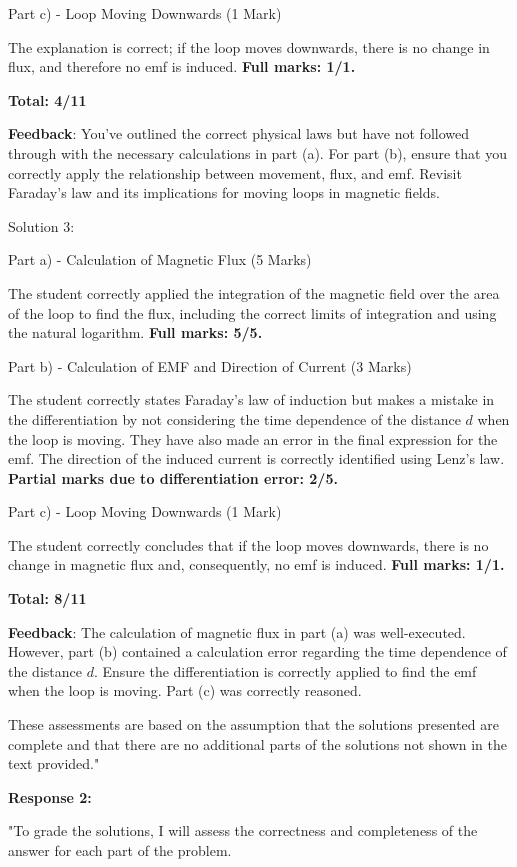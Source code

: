 \documentclass[a4paper,11pt]{article}
\begin{document}
Part c) - Loop Moving Downwards (1 Mark)

The explanation is correct; if the loop moves downwards, there is no change in flux, and therefore no emf is induced. \textbf{Full marks: 1/1.}

\textbf{Total: 4/11}

\textbf{Feedback}: You've outlined the correct physical laws but have not followed through with the necessary calculations in part (a). For part (b), ensure that you correctly apply the relationship between movement, flux, and emf. Revisit Faraday's law and its implications for moving loops in magnetic fields.

Solution 3:

Part a) - Calculation of Magnetic Flux (5 Marks)

The student correctly applied the integration of the magnetic field over the area of the loop to find the flux, including the correct limits of integration and using the natural logarithm. \textbf{Full marks: 5/5.}

Part b) - Calculation of EMF and Direction of Current (3 Marks)

The student correctly states Faraday's law of induction but makes a mistake in the differentiation by not considering the time dependence of the distance \( d \) when the loop is moving. They have also made an error in the final expression for the emf. The direction of the induced current is correctly identified using Lenz's law. \textbf{Partial marks due to differentiation error: 2/5.}

Part c) - Loop Moving Downwards (1 Mark)

The student correctly concludes that if the loop moves downwards, there is no change in magnetic flux and, consequently, no emf is induced. \textbf{Full marks: 1/1.}

\textbf{Total: 8/11}

\textbf{Feedback}: The calculation of magnetic flux in part (a) was well-executed. However, part (b) contained a calculation error regarding the time dependence of the distance \( d \). Ensure the differentiation is correctly applied to find the emf when the loop is moving. Part (c) was correctly reasoned.

These assessments are based on the assumption that the solutions presented are complete and that there are no additional parts of the solutions not shown in the text provided."

\textbf{Response 2:}

"To grade the solutions, I will assess the correctness and completeness of the answer for each part of the problem. 
\end{document}
